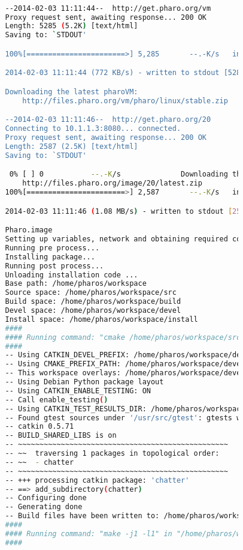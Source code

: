 \documentclass[a4paper,10pt,twoside]{book}
\begin{document}
			\begin{lstlisting}[language=bash,title={Installation output}]

				--2014-02-03 11:11:44--  http://get.pharo.org/vm
				Proxy request sent, awaiting response... 200 OK
				Length: 5285 (5.2K) [text/html]
				Saving to: `STDOUT'

				100%[=======================>] 5,285       --.-K/s   in 0.007s  

				2014-02-03 11:11:44 (772 KB/s) - written to stdout [5285/5285]

				Downloading the latest pharoVM:
					http://files.pharo.org/vm/pharo/linux/stable.zip

				--2014-02-03 11:11:46--  http://get.pharo.org/20
				Connecting to 10.1.1.3:8080... connected.
				Proxy request sent, awaiting response... 200 OK
				Length: 2587 (2.5K) [text/html]
				Saving to: `STDOUT'

				 0% [ ] 0           --.-K/s              Downloading the latest 20 Image:
				    http://files.pharo.org/image/20/latest.zip
				100%[=======================>] 2,587       --.-K/s   in 0.002s  

				2014-02-03 11:11:46 (1.08 MB/s) - written to stdout [2587/2587]

				Pharo.image
				Setting up variables, network and obtaining required code....
				Running pre process...  
				Installing package... 
				Running post process... 
				Unloading installation code ... 
				Base path: /home/pharos/workspace
				Source space: /home/pharos/workspace/src
				Build space: /home/pharos/workspace/build
				Devel space: /home/pharos/workspace/devel
				Install space: /home/pharos/workspace/install
				####
				#### Running command: "cmake /home/pharos/workspace/src -DCATKIN_DEVEL_PREFIX=/home/pharos/workspace/devel -DCMAKE_INSTALL_PREFIX=/home/pharos/workspace/install" in "/home/pharos/workspace/build"
				####
				-- Using CATKIN_DEVEL_PREFIX: /home/pharos/workspace/devel
				-- Using CMAKE_PREFIX_PATH: /home/pharos/workspace/devel;/opt/ros/groovy;/home/viki/ros/workspace/devel
				-- This workspace overlays: /home/pharos/workspace/devel;/opt/ros/groovy
				-- Using Debian Python package layout
				-- Using CATKIN_ENABLE_TESTING: ON
				-- Call enable_testing()
				-- Using CATKIN_TEST_RESULTS_DIR: /home/pharos/workspace/build/test_results
				-- Found gtest sources under '/usr/src/gtest': gtests will be built
				-- catkin 0.5.71
				-- BUILD_SHARED_LIBS is on
				-- ~~~~~~~~~~~~~~~~~~~~~~~~~~~~~~~~~~~~~~~~~~~~~~~~~
				-- ~~  traversing 1 packages in topological order:
				-- ~~  - chatter
				-- ~~~~~~~~~~~~~~~~~~~~~~~~~~~~~~~~~~~~~~~~~~~~~~~~~
				-- +++ processing catkin package: 'chatter'
				-- ==> add_subdirectory(chatter)
				-- Configuring done
				-- Generating done
				-- Build files have been written to: /home/pharos/workspace/build
				####
				#### Running command: "make -j1 -l1" in "/home/pharos/workspace/build"
				####

			\end{lstlisting}
			 
\end{document}
